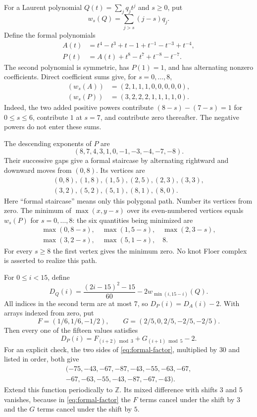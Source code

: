 \documentclass[11pt]{article}
\theoremstyle{remark}
\newcommand{\Z}{\mathbb Z}
\begin{document}
For a Laurent polynomial $Q(t)=\sum_jq_jt^j$ and $s\geq0$, put
\[
 w_s(Q)=\sum_{j>s}(j-s)q_j.
\]
Define the formal polynomials
\begin{align*}
 A(t)&=t^4-t^3+t-1+t^{-1}-t^{-3}+t^{-4},\\
 P(t)&=A(t)+t^8-t^7+t^{-8}-t^{-7}.
\end{align*}
The second polynomial is symmetric, has $P(1)=1$, and has alternating nonzero coefficients. Direct coefficient sums give, for $s=0,\ldots,8$,
\begin{align*}
 (w_s(A))&=(2,1,1,1,0,0,0,0,0),\\
 (w_s(P))&=(3,2,2,2,1,1,1,1,0).
\end{align*}
Indeed, the two added positive powers contribute $(8-s)-(7-s)=1$ for $0\leq s\leq6$, contribute $1$ at $s=7$, and contribute zero thereafter. The negative powers do not enter these sums.

The descending exponents of $P$ are
\[
 (8,7,4,3,1,0,-1,-3,-4,-7,-8).
\]
Their successive gaps give a formal staircase by alternating rightward and downward moves from $(0,8)$. Its vertices are
\[
 \begin{gathered}
 (0,8),(1,8),(1,5),(2,5),(2,3),(3,3),\\
 (3,2),(5,2),(5,1),(8,1),(8,0).
 \end{gathered}
\]
Here ``formal staircase'' means only this polygonal path. Number its vertices from zero. The minimum of $\max(x,y-s)$ over its even-numbered vertices equals $w_s(P)$ for $s=0,\ldots,8$: the six quantities being minimized are
\[
 \begin{gathered}
 \max(0,8-s),\quad \max(1,5-s),\quad \max(2,3-s),\\
 \max(3,2-s),\quad \max(5,1-s),\quad 8.
 \end{gathered}
\]
For every $s\geq8$ the first vertex gives the minimum zero. No knot Floer complex is asserted to realize this path.

For $0\leq i<15$, define
\[
 D_Q(i)=\frac{(2i-15)^2-15}{60}-2w_{\min(i,15-i)}(Q).
\]
All indices in the second term are at most $7$, so $D_P(i)=D_A(i)-2$. With arrays indexed from zero, put
\[
 F=(1/6,1/6,-1/2),\qquad
 G=(2/5,0,2/5,-2/5,-2/5).
\]
Then every one of the fifteen values satisfies
\begin{equation}\label{eq:formal-factor}
 D_P(i)=F_{(i+2)\bmod3}+G_{(i+1)\bmod5}-2.
\end{equation}
For an explicit check, the two sides of \eqref{eq:formal-factor}, multiplied by $30$ and listed in order, both give
\[
 \begin{gathered}
 (-75,-43,-67,-87,-43,-55,-63,-67,\\
 -67,-63,-55,-43,-87,-67,-43).
 \end{gathered}
\]
Extend this function periodically to $\Z$. Its mixed difference with shifts $3$ and $5$ vanishes, because in \eqref{eq:formal-factor} the $F$ terms cancel under the shift by $3$ and the $G$ terms cancel under the shift by $5$.
\end{document}
